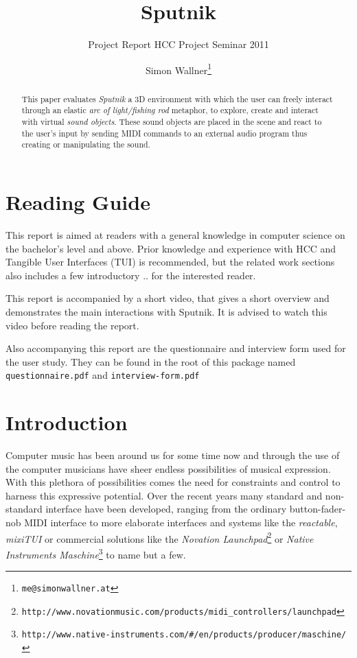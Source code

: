 \documentclass[10pt,a4paper]{scrartcl}
\title{Sputnik}
\subtitle{Project Report HCC Project Seminar 2011}
\author{Simon Wallner\footnote{\texttt{me@simonwallner.at}}}
\begin{document}
\maketitle

\begin{abstract}
This paper evaluates \emph{Sputnik} a 3D environment with which the user can freely interact through an elastic \emph{arc of light/fishing rod} metaphor, to explore, create and interact with virtual \emph{sound objects}. These sound objects are placed in the scene and react to the user's input by sending MIDI commands to an external audio program thus creating or manipulating the sound.

\end{abstract}

\section{Reading Guide}
This report is aimed at readers with a general knowledge in computer science on the bachelor's level and above. Prior knowledge and experience with HCC and Tangible User Interfaces (TUI) is recommended, but the related work sections also includes a few introductory .. for the interested reader.

This report is accompanied by a short video, that gives a short overview and demonstrates the main interactions with Sputnik. It is advised to watch this video before reading the report. 

Also accompanying this report are the questionnaire and interview form used for the user study. They can be found in the root of this package named \texttt{questionnaire.pdf} and \texttt{interview-form.pdf}


\section{Introduction}

Computer music has been around us for some time now and through the use of the computer musicians have sheer endless possibilities of musical expression. With this plethora of possibilities comes the need for constraints and control to harness this expressive potential. Over the recent years many standard and non-standard interface have been developed, ranging from the ordinary button-fader-nob MIDI interface to more elaborate interfaces and systems like the \emph{reactable}\citep{Jorda2007}, \emph{mixiTUI}\citep{Pedersen2009} or commercial solutions like the \emph{Novation Launchpad}\footnote{\texttt{http://www.novationmusic.com/products/midi\_controllers/launchpad}} or \emph{Native Instruments Maschine}\footnote{\texttt{http://www.native-instruments.com/\#/en/products/producer/maschine/}} to name but a few.
\end{document}
